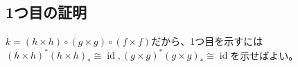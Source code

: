 \documentclass[uplatex, a4paper, dvipdfmx]{jsarticle}
\theoremstyle{definition}
\newtheorem{remark}[theorem]{補足}
\DeclareMathOperator{\id}{\mathrm{id}}
\DeclareMathOperator{\Spec}{\mathrm{Spec}}
\DeclareMathOperator{\QCoh}{\mathrm{QCoh}}
\begin{document}


\subsection{1つ目の証明}
$k = (h \times h) \circ (g \times g) \circ (f \times f)$だから、1つ目を示すには$(h \times h)^*(h \times h)_* \cong \id, (g \times g)^*(g \times g)_* \cong \id$を示せばよい。
\end{document}
